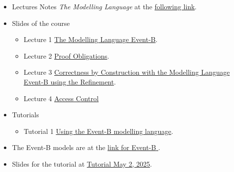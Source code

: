 \documentclass[ 12pt]{article}
\begin{document}
\begin{itemize}
\item  Lectures Notes   \textit{The Modelling Language} at the
  \href{http://mery54.github.io/teaching/mosos/lecturesnotes/main-Poly1.pdf}{following
    link}.
\item Slides of the course
  \begin{itemize}
\item Lecture 1
  \href{http://mery54.github.io/teaching/mosos/lecturesnotes/mcfsi-lect1.pdf}{The 
    Modelling Language Event-B}.
  
  \item Lecture 2
    \href{http://mery54.github.io/teaching/mosos/lecturesnotes/mcfsi-po.pdf}{Proof
      Obligations}.
     \item Lecture 3 
    \href{http://mery54.github.io/teaching/mosos/lecturesnotes/mcfsi-lect2.pdf}{Correctness by Construction with the  
      Modelling Language Event-B using the Refinement}.
         \item Lecture 4
    \href{http://mery54.github.io/teaching/mosos/lecturesnotes/mcfsi-lect3.pdf}{Access
      Control }
    
      \end{itemize}
\item Tutorials
  \begin{itemize}
  \item   Tutorial 1
    \href{http://mery54.github.io/teaching/mosos/lecturesnotes/tutorial1.pdf}{Using
      the Event-B modelling language}.
  \end{itemize}
\item  The Event-B models are at the
  \href{http://mery54.github.io/teaching/models/}{link for
    \textsf{Event-B} }.
  
\item Slides for the tutorial  at
  \href{http://mery54.github.io/teaching/mosos/lecturesnotes/mcfsi-maynooth-tut.pdf}{Tutorial
  May 2, 2025}.
  \end{itemize}






\end{document}
